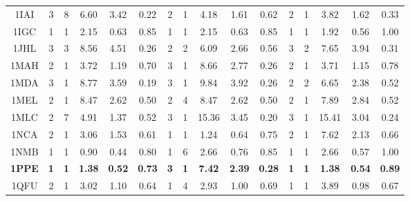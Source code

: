 \begin{longtable}{c c c c c c|c c c c c|c c c c c}
 {\tiny 1IAI}&{\tiny 3}&{\tiny 8}&{\tiny 6.60}&{\tiny 3.42}&{\tiny 0.22}&{\tiny 2}&{\tiny 1}&{\tiny 4.18}&{\tiny 1.61}&{\tiny 0.62}&{\tiny 2}&{\tiny 1}&{\tiny 3.82}&{\tiny 1.62}&{\tiny 0.33}\\ 
 {\tiny 1IGC}&{\tiny 1}&{\tiny 1}&{\tiny 2.15}&{\tiny 0.63}&{\tiny 0.85}&{\tiny 1}&{\tiny 1}&{\tiny 2.15}&{\tiny 0.63}&{\tiny 0.85}&{\tiny 1}&{\tiny 1}&{\tiny 1.92}&{\tiny 0.56}&{\tiny 1.00}\\ 
 {\tiny 1JHL}&{\tiny 3}&{\tiny 3}&{\tiny 8.56}&{\tiny 4.51}&{\tiny 0.26}&{\tiny 2}&{\tiny 2}&{\tiny 6.09}&{\tiny 2.66}&{\tiny 0.56}&{\tiny 3}&{\tiny 2}&{\tiny 7.65}&{\tiny 3.94}&{\tiny 0.31}\\ 
 {\tiny 1MAH}&{\tiny 2}&{\tiny 1}&{\tiny 3.72}&{\tiny 1.19}&{\tiny 0.70}&{\tiny 3}&{\tiny 1}&{\tiny 8.66}&{\tiny 2.77}&{\tiny 0.26}&{\tiny 2}&{\tiny 1}&{\tiny 3.71}&{\tiny 1.15}&{\tiny 0.78}\\ 
 {\tiny 1MDA}&{\tiny 3}&{\tiny 1}&{\tiny 8.77}&{\tiny 3.59}&{\tiny 0.19}&{\tiny 3}&{\tiny 1}&{\tiny 9.84}&{\tiny 3.92}&{\tiny 0.26}&{\tiny 2}&{\tiny 2}&{\tiny 6.65}&{\tiny 2.38}&{\tiny 0.52}\\ 
 {\tiny 1MEL}&{\tiny 2}&{\tiny 1}&{\tiny 8.47}&{\tiny 2.62}&{\tiny 0.50}&{\tiny 2}&{\tiny 4}&{\tiny 8.47}&{\tiny 2.62}&{\tiny 0.50}&{\tiny 2}&{\tiny 1}&{\tiny 7.89}&{\tiny 2.84}&{\tiny 0.52}\\ 
 {\tiny 1MLC}&{\tiny 2}&{\tiny 7}&{\tiny 4.91}&{\tiny 1.37}&{\tiny 0.52}&{\tiny 3}&{\tiny 1}&{\tiny 15.36}&{\tiny 3.45}&{\tiny 0.20}&{\tiny 3}&{\tiny 1}&{\tiny 15.41}&{\tiny 3.04}&{\tiny 0.24}\\ 
 {\tiny 1NCA}&{\tiny 2}&{\tiny 1}&{\tiny 3.06}&{\tiny 1.53}&{\tiny 0.61}&{\tiny 1}&{\tiny 1}&{\tiny 1.24}&{\tiny 0.64}&{\tiny 0.75}&{\tiny 2}&{\tiny 1}&{\tiny 7.62}&{\tiny 2.13}&{\tiny 0.66}\\ 
 {\tiny 1NMB}&{\tiny 1}&{\tiny 1}&{\tiny 0.90}&{\tiny 0.44}&{\tiny 0.80}&{\tiny 1}&{\tiny 6}&{\tiny 2.66}&{\tiny 0.76}&{\tiny 0.85}&{\tiny 1}&{\tiny 1}&{\tiny 2.66}&{\tiny 0.57}&{\tiny 1.00}\\ 
 \textbf{\tiny 1PPE}&\textbf{\tiny 1}&\textbf{\tiny 1}&\textbf{\tiny 1.38}&\textbf{\tiny 0.52}&\textbf{\tiny 0.73}&\textbf{\tiny 3}&\textbf{\tiny 1}&\textbf{\tiny 7.42}&\textbf{\tiny 2.39}&\textbf{\tiny 0.28}&\textbf{\tiny 1}&\textbf{\tiny 1}&\textbf{\tiny 1.38}&\textbf{\tiny 0.54}&\textbf{\tiny 0.89}\\ 
 {\tiny 1QFU}&{\tiny 2}&{\tiny 1}&{\tiny 3.02}&{\tiny 1.10}&{\tiny 0.64}&{\tiny 1}&{\tiny 4}&{\tiny 2.93}&{\tiny 1.00}&{\tiny 0.69}&{\tiny 1}&{\tiny 1}&{\tiny 3.89}&{\tiny 0.98}&{\tiny 0.67}\\ 

\end{longtable}
